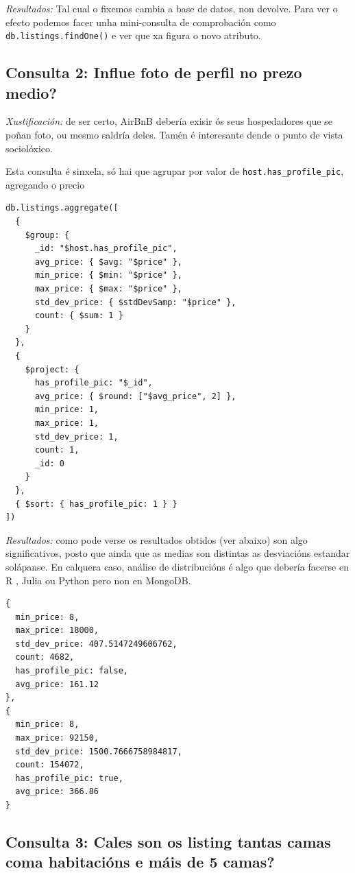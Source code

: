\documentclass[12pt,a4paper]{article}
\begin{document}
\emph{Resultados:} Tal cual o fixemos cambia a base de datos, non devolve. Para ver o efecto podemos facer unha mini-consulta de comprobación como \texttt{db.listings.findOne()} e ver que xa figura o novo atributo.


\subsection*{Consulta 2: Influe foto de perfil no prezo medio?} 

\emph{Xustificación:} de ser certo, AirBnB debería exisir ós seus hospedadores que se poñan foto, ou mesmo saldría deles. Tamén é interesante dende o punto de vista sociolóxico.

Esta consulta é sinxela, só hai que agrupar por valor de \texttt{host.has\_profile\_pic}, agregando o precio

\begin{lstlisting}
db.listings.aggregate([
  {
    $group: {
      _id: "$host.has_profile_pic",
      avg_price: { $avg: "$price" },
      min_price: { $min: "$price" },
      max_price: { $max: "$price" },
      std_dev_price: { $stdDevSamp: "$price" },
      count: { $sum: 1 }
    }
  },
  {
    $project: {
      has_profile_pic: "$_id",
      avg_price: { $round: ["$avg_price", 2] },
      min_price: 1,
      max_price: 1,
      std_dev_price: 1,
      count: 1,
      _id: 0
    }
  },
  { $sort: { has_profile_pic: 1 } }
])
\end{lstlisting}

\emph{Resultados:} como pode verse os resultados obtidos (ver abaixo) son algo significativos, posto que ainda que as medias son distintas as desviacións estandar solápanse. En calquera caso, análise de distribucións é algo que debería facerse en R \cite{r_license}, Julia \cite{julia_license} ou Python pero non en MongoDB.
\begin{lstlisting}[style=terminal]
{
  min_price: 8,
  max_price: 18000,
  std_dev_price: 407.5147249606762,
  count: 4682,
  has_profile_pic: false,
  avg_price: 161.12
},
{
  min_price: 8,
  max_price: 92150,
  std_dev_price: 1500.7666758984817,
  count: 154072,
  has_profile_pic: true,
  avg_price: 366.86
}
\end{lstlisting}


\subsection*{Consulta 3: Cales son os listing tantas camas coma habitacións e máis de 5 camas?}
\end{document}
